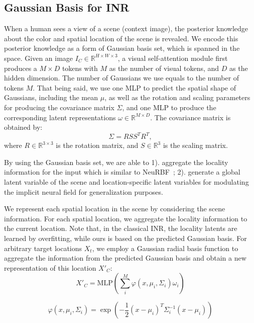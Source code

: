 \subsection{Gaussian Basis for INR}
 When a human sees a view of a scene (context image), the posterior knowledge about the color and spatial location of the scene is revealed. We encode this posterior knowledge as a form of Gaussian basis set, which is spanned in the space. 
Given an image $I_C \in \mathbb{R}^{H\times W \times 3}$, a visual self-attention module first produces a $M\times D$ tokens with $M$ as the number of visual tokens, and $D$ as the hidden dimension. The number of Gaussians we use equals to the number of tokens $M$. That being said, we use one MLP to predict the spatial shape of Gaussians, including the mean $\mu$, as well as the rotation and scaling parameters for producing the covariance matrix $\Sigma$, and one MLP to produce the corresponding latent representations $\omega \in \mathbb{R}^{M \times D} $. The covariance matrix is obtained by:
\begin{equation}
    \Sigma = RSS^TR^T,
    \label{eq:cov-matrix}
\end{equation}
where $R\in \mathbb{R}^{3\times3}$ is the rotation matrix, and $S \in \mathbb{R}^3$ is the scaling matrix. 

By using the Gaussian basis set, we are able to 1). aggregate the locality information for the input which is similar to NeuRBF~\cite{chen2023neurbf}; 2). generate a global latent variable of the scene and location-specific latent variables for modulating the implicit neural field for generalization purposes.

 We represent each spatial location in the scene by considering the scene information. For each spatial location, we aggregate the locality information to the current location. Note that, in the classical INR, the locality latents are learned by overfitting, while ours is based on the predicted Gaussian basis. For arbitrary target locations $X_t$, we employ a Gaussian radial basis function to aggregate the information from the predicted Gaussian basis and obtain a new representation of this location $X'_C$:
\begin{equation}
    X'_C = \text{MLP}(\sum_i^{M} \varphi(x, \mu_i, \Sigma_i)\omega_i)
\end{equation}

\begin{equation}
    \varphi(x, \mu_i, \Sigma_i) = \exp(-\frac{1}{2} (x-\mu_i)^T\Sigma_i^{-1}(x-\mu_i))
\end{equation}

